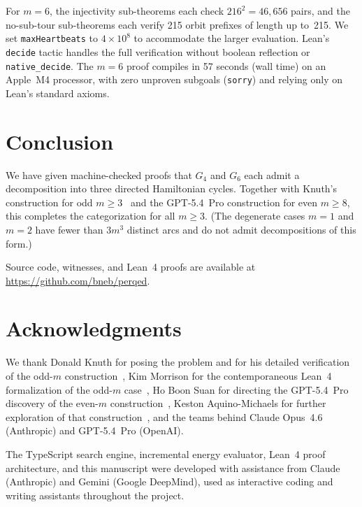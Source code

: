 \documentclass[11pt]{article}
\theoremstyle{plain}
\begin{document}
For $m=6$, the injectivity sub-theorems each check $216^2 = 46{,}656$ pairs,
and the no-sub-tour sub-theorems each verify 215 orbit prefixes of length
up to~215. We set \texttt{maxHeartbeats} to $4 \times 10^8$ to accommodate
the larger evaluation. Lean's \texttt{decide} tactic handles the full
verification without boolean reflection or \texttt{native\_decide}.
The $m=6$ proof compiles in 57 seconds (wall time) on an Apple~M4
processor, with zero unproven subgoals (\texttt{sorry}) and relying
only on Lean's standard axioms.

\section{Conclusion}

We have given machine-checked proofs that $G_4$ and $G_6$ each admit a
decomposition into three directed Hamiltonian cycles. Together with
Knuth's construction for odd $m \ge 3$~\cite{knuth2026} and the
GPT-5.4~Pro construction for even $m \ge 8$, this completes the
categorization for all $m \ge 3$.
(The degenerate cases $m=1$ and $m=2$ have fewer than $3m^3$ distinct arcs
and do not admit decompositions of this form.)

Source code, witnesses, and Lean~4 proofs are available at
\url{https://github.com/bneb/perqed}.

\section*{Acknowledgments}

We thank Donald Knuth for posing the problem and for his detailed
verification of the odd-$m$ construction~\cite{knuth2026}, Kim Morrison
for the contemporaneous Lean~4 formalization of the odd-$m$
case~\cite{morrison2026}, Ho Boon Suan for directing the GPT-5.4~Pro
discovery of the even-$m$ construction~\cite{hoboonsuan2026},
Keston Aquino-Michaels for further exploration of that
construction~\cite{aquino2026}, and the teams behind Claude Opus~4.6
(Anthropic) and GPT-5.4~Pro (OpenAI).

The TypeScript search engine, incremental energy evaluator, Lean~4 proof
architecture, and this manuscript were developed with assistance from
Claude (Anthropic) and Gemini (Google DeepMind), used as interactive
coding and writing assistants throughout the project.
\end{document}
